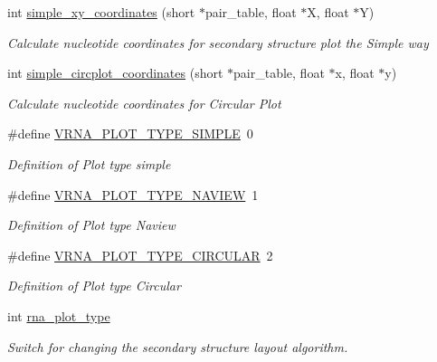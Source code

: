 \begin{DoxyCompactItemize}
\item 
int \hyperlink{group__plotting__utils_gaf4b9173e7d3fd361c3c85e6def194123}{simple\+\_\+xy\+\_\+coordinates} (short $\ast$pair\+\_\+table, float $\ast$X, float $\ast$Y)
\begin{DoxyCompactList}\small\item\em Calculate nucleotide coordinates for secondary structure plot the {\itshape Simple way} \end{DoxyCompactList}\item 
int \hyperlink{group__plotting__utils_gac4ea13d35308f09940178d2b05a248c2}{simple\+\_\+circplot\+\_\+coordinates} (short $\ast$pair\+\_\+table, float $\ast$x, float $\ast$y)
\begin{DoxyCompactList}\small\item\em Calculate nucleotide coordinates for {\itshape Circular Plot} \end{DoxyCompactList}\item 
\#define \hyperlink{group__plotting__utils_gae6d17b9f0a53cf5205a9181e0f8422e9}{V\+R\+N\+A\+\_\+\+P\+L\+O\+T\+\_\+\+T\+Y\+P\+E\+\_\+\+S\+I\+M\+P\+LE}~0
\begin{DoxyCompactList}\small\item\em Definition of Plot type {\itshape simple} \end{DoxyCompactList}\item 
\#define \hyperlink{group__plotting__utils_ga94d4c863ecac2f220f76658afb92f964}{V\+R\+N\+A\+\_\+\+P\+L\+O\+T\+\_\+\+T\+Y\+P\+E\+\_\+\+N\+A\+V\+I\+EW}~1
\begin{DoxyCompactList}\small\item\em Definition of Plot type {\itshape Naview} \end{DoxyCompactList}\item 
\#define \hyperlink{group__plotting__utils_ga8c9eac631348da92136c8363ecdd9fb9}{V\+R\+N\+A\+\_\+\+P\+L\+O\+T\+\_\+\+T\+Y\+P\+E\+\_\+\+C\+I\+R\+C\+U\+L\+AR}~2
\begin{DoxyCompactList}\small\item\em Definition of Plot type {\itshape Circular} \end{DoxyCompactList}\item 
int \hyperlink{group__plotting__utils_ga5964c4581431b098b80027d6e14dcdd4}{rna\+\_\+plot\+\_\+type}
\begin{DoxyCompactList}\small\item\em Switch for changing the secondary structure layout algorithm. \end{DoxyCompactList}\end{DoxyCompactItemize}
